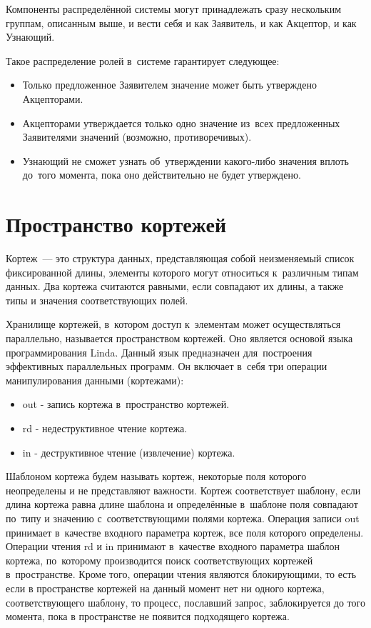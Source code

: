 Компоненты распределённой системы могут принадлежать сразу нескольким группам, описанным выше, и вести себя и как Заявитель, и как Акцептор, и как Узнающий.

Такое распределение ролей в~системе гарантирует следующее:
\begin{itemize}
	\item Только предложенное Заявителем значение может быть утверждено Акцепторами.
	\item Акцепторами утверждается только одно значение из~всех предложенных Заявителями значений (возможно, противоречивых).
	\item Узнающий не сможет узнать об~утверждении какого-либо значения вплоть до~того момента, пока оно действительно не будет утверждено.
\end{itemize}




\section{Пространство кортежей}\label{sec:4}
Кортеж~--- это структура данных, представляющая собой неизменяемый список фиксированной длины, элементы которого могут относиться к~различным типам данных. Два кортежа считаются равными, если совпадают их длины, а также типы и значения соответствующих полей.

Хранилище кортежей, в~котором доступ к~элементам может осуществляться параллельно, называется пространством кортежей. Оно является основой языка программирования Linda. Данный язык предназначен для~построения эффективных параллельных программ. Он включает в~себя три операции манипулирования данными (кортежами):
\begin{itemize}
	\item out - запись кортежа в~пространство кортежей.
	\item rd - недеструктивное чтение кортежа.
	\item in - деструктивное чтение (извлечение) кортежа.
\end{itemize}

Шаблоном кортежа будем называть кортеж, некоторые поля которого неопределены и не представляют важности. Кортеж соответствует шаблону, если длина кортежа равна длине шаблона и определённые в~шаблоне поля совпадают по~типу и значению с~соответствующими полями кортежа. Операция записи out принимает в~качестве входного параметра кортеж, все поля которого определены. Операции чтения rd и in принимают в~качестве входного параметра шаблон кортежа, по~которому производится поиск соответствующих кортежей в~пространстве. Кроме того, операции чтения являются блокирующими, то есть если в пространстве кортежей на данный момент нет ни одного кортежа, соответствующего шаблону, то процесс, пославший запрос, заблокируется до того момента, пока в пространстве не появится подходящего кортежа.

